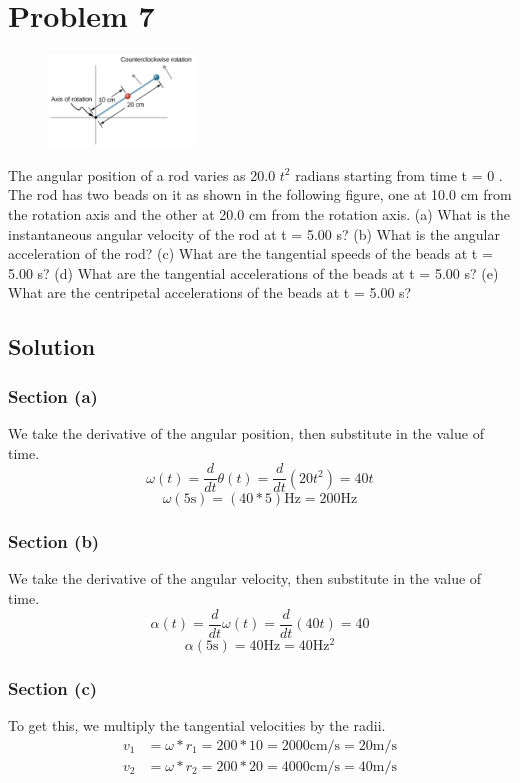 \documentclass[12pt]{article}
\begin{document}
\pagebreak
\section*{Problem 7}
\begin{figure}
    \vspace{-30pt}
    \includegraphics[width=0.35\textwidth]{graph_7.png} 
\end{figure}
The angular position of a rod varies as 20.0 $t^2$ radians starting from time t = 0 . The rod has
two beads on it as shown in the following figure, one at 10.0 cm from the rotation axis and the
other at 20.0 cm from the rotation axis. (a) What is the instantaneous angular velocity of the rod
at t = 5.00 s? (b) What is the angular acceleration of the rod? (c) What are the tangential speeds
of the beads at t = 5.00 s? (d) What are the tangential accelerations of the beads at t = 5.00 s? (e)
What are the centripetal accelerations of the beads at t = 5.00 s?

\subsection*{Solution}
\subsubsection*{Section (a)}
We take the derivative of the angular position, then substitute in the value of time.
\[ \omega(t) = \frac{d}{dt}\theta(t) = \frac{d}{dt}(20t^2) = 40t \]
\[ \omega(5\unit{\second}) = (40*5) \unit{\hertz} = \boxed{200 \unit{\hertz}} \]

\subsubsection*{Section (b)}
We take the derivative of the angular velocity, then substitute in the value of time.
\[ \alpha(t) = \frac{d}{dt}\omega(t) = \frac{d}{dt}(40t) = 40 \]
\[ \alpha(5\unit{\second}) = 40 \unit{\hertz} = \boxed{40 \unit{\hertz^2}} \]

\subsubsection*{Section (c)}
To get this, we multiply the tangential velocities by the radii. 
\begin{align*}
    v_1 &=  \omega * r_1 = 200 * 10 = 2000\unit{\centi\meter/\second} = \boxed{20 \unit{\meter/\second}}\\
    v_2 &=  \omega * r_2 = 200 * 20 = 4000\unit{\centi\meter/\second} = \boxed{40 \unit{\meter/\second}}
\end{align*}
\end{document}
